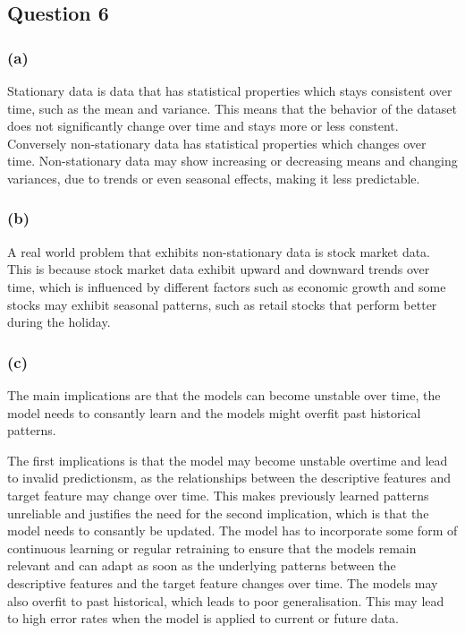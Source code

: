 \documentclass[10pt]{article}
\begin{document}
\subsection*{Question 6}

\subsubsection*{(a)}

Stationary data is data that has statistical properties which stays consistent over time, such as the mean and variance.
This means that the behavior of the dataset does not significantly change over time and stays more or less constent. Conversely
non-stationary data has statistical properties which changes over time. Non-stationary data may show increasing or decreasing
means and changing variances, due to trends or even seasonal effects, making it less predictable. 

\subsubsection*{(b)}

A real world problem that exhibits non-stationary data is stock market data. This is because stock market data
exhibit upward and downward trends over time, which is influenced by different factors such as economic growth
and some stocks may exhibit seasonal patterns, such as retail stocks that perform better during the holiday. 

\subsubsection*{(c)}

The main implications are that the models can become unstable over time, the model needs to consantly learn and
the models might overfit past historical patterns.

The first implications is that the model may become unstable overtime and lead to invalid predictionsm, as the
relationships between the descriptive features and target feature may change over time. This makes previously
learned patterns unreliable and justifies the need for the second implication, which is that the model
needs to consantly be updated. The model has to incorporate some form of continuous learning or regular retraining
to ensure that the models remain relevant and can adapt as soon as the underlying patterns
between the descriptive features and the target feature changes over time. The models may also overfit to
past historical, which leads to poor generalisation. This may lead to high error rates when the model is applied to
current or future data.
\end{document}
